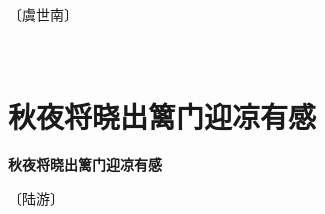 \documentclass[12pt,UTF-8,openany,fontset=none]{ctexbook}
\begin{document}
\begin{center}
    \vspace{10pt}
    
    \begin{large}
        
        〔虞世南〕
        
    \end{large}
    
    \vspace{8pt}
    
    \begin{huge}
        
        \phantom{。}

        \phantom{。}
        
        \phantom{。}

        \phantom{。}~~
        
    \end{huge}
    
\end{center}
\clearpage

\section{秋夜将晓出篱门迎凉有感}



\begin{center}
    {\bfseries 秋夜将晓出篱门迎凉有感}
\end{center}

\begin{center}
    \vspace{10pt}
    
    \begin{large}
        
        〔陆游〕
        
    \end{large}
    
    \vspace{8pt}
    
    \begin{huge}
        
        \phantom{。}

        \phantom{。}
        
        \phantom{。}

        \phantom{。}
        
    \end{huge}
    
\end{center}
\end{document}
